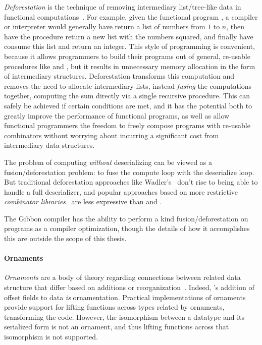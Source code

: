 \emph{Deforestation} is the technique of removing intermediary list/tree-like
data in functional computations~\cite{wadler-deforestation}.
%
For example, given the functional program , a
compiler or interpreter would generally have  return a list of
numbers from $1$ to $n$, then have the  procedure return a new list with
the numbers squared, and finally have  consume this list and return an
integer. This style of programming is convenient, because it allows programmers
to build their programs out of general, re-usable procedures like  and
, but it results in unnecessary memory allocation in the form of
intermediary structures. Deforestation transforms this computation and removes
the need to allocate intermediary lists, instead \emph{fusing} the computations
together, computing the sum directly via a single recursive procedure. This can
safely be achieved if certain conditions are met, and it has the potential both
to greatly improve the performance of functional programs, as well as allow
functional programmers the freedom to freely compose programs with re-usable
combinators without worrying about incurring a significant cost from
intermediary data structures.

The problem of computing \emph{without} deserializing can be viewed as a
fusion/deforestation problem: to fuse the compute loop with the deserialize
loop. But traditional deforestation approaches like
Wadler's~\cite{wadler-deforestation} don't rise to being able to handle a full
deserializer, and popular approaches based on more restrictive \emph{combinator
libraries}~\cite{stream-fusion} are less expressive than \lamadt{} and
\ourcalc{}.

The Gibbon compiler has the ability to perform a kind fusion/deforestation on
\lamadt{} programs as a compiler optimization, though the details of how it
accomplishes this are outside the scope of this thesis.

\paragraph{Ornaments}

\emph{Ornaments} are a body of theory regarding connections between related
data structure that differ based on additions or
reorganization~\cite{ornaments}.
%
Indeed, \ourcalc's addition of offset fields to data \emph{is} ornamentation.
%
Practical implementations of ornaments~\cite{ornament-ml} provide support for
lifting functions across types related by ornaments, transforming the code.
%
However, the isomorphism between a datatype and its serialized form is not an
ornament, and thus lifting functions across that isomorphism is not supported.

